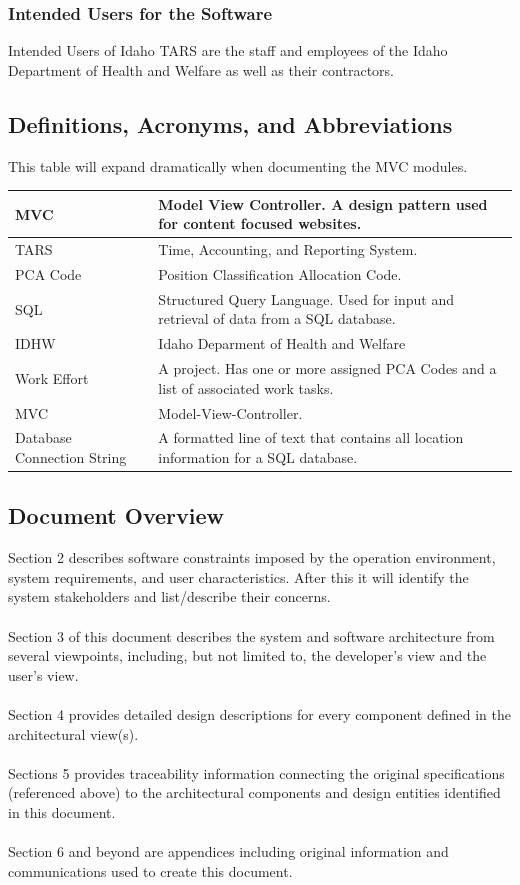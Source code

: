 \documentclass[letterpaper]{article}
\begin{document}
\subsubsection{Intended Users for the Software}
Intended Users of Idaho TARS are the staff and employees of the Idaho Department of Health and Welfare as well as their contractors.

\subsection{\bfseries{Definitions, Acronyms, and Abbreviations}}
This table will expand dramatically when documenting the MVC modules.
\begin{center}
\begin{tabular}{| l | p{10cm} |}
\hline
MVC & Model View Controller. A design pattern used for content focused websites. \\ \hline
TARS & Time, Accounting, and Reporting System. \\ \hline
PCA Code & Position Classification Allocation Code. \\ \hline
SQL & Structured Query Language. Used for input and retrieval of data from a SQL database.\\ \hline
IDHW & Idaho Deparment of Health and Welfare \\ \hline
Work Effort & A project. Has one or more assigned PCA Codes and a list of associated work tasks.\\ \hline
MVC & Model-View-Controller.\\ \hline
Database Connection String & A formatted line of text that contains all location information for a SQL database. \\
\hline
\end{tabular}
\end{center}

\subsection{\bfseries{Document Overview}}
Section 2 describes software constraints imposed by the operation environment, system requirements, and user characteristics. After this it will identify the system stakeholders and list/describe their concerns.  \\
\\
Section 3 of this document describes the system and software
architecture from several viewpoints, including, but not limited to,
the developer{\textquoteright}s view and the user{\textquoteright}s
view.\\
\\
Section 4 provides detailed design descriptions for every component
defined in the architectural view(s). \\
\\
Sections 5 provides traceability information connecting the original specifications
(referenced above) to the architectural components and design entities identified in this document.\\
\\
Section 6 and beyond are appendices including original information and communications used to create this document.
\end{document}
